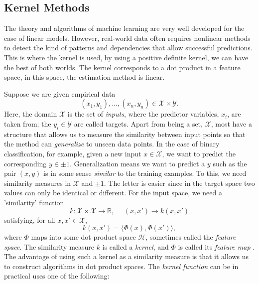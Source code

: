 \subsection{Kernel Methods}
The theory and algorithms of machine learning are very well developed for the case of linear models. However, real-world data often requires nonlinear methods to detect the kind of patterns and dependencies that allow successful predictions. This is where the kernel is used, by using a positive definite kernel, we can have the best of both worlds. The kernel corresponds to a dot product in a feature space, in this space, the estimation method is linear\cite{Hofmann2008}. 

Suppose we are given empirical data
\begin{equation}
(x_1, y_1), ..., (x_n, y_n) \in \mathcal{X} \times \mathcal{Y}.
\end{equation}
Here, the domain $\mathcal{X}$ is the set of \textit{inputs}, where the predictor variables, $x_i$, are taken from; the $y_i \in \mathcal{Y}$ are called targets. Apart from being a set, $\mathcal{X}$, most have a structure that allows us to measure the similarity between input points so that the method can \textit{generalize} to unseen data points. In the case of binary classification, for example, given a new input $x\in \mathcal{X}$, we want to predict the corresponding $y \in {\pm 1}$. Generalization means we want to predict a $y$ such as the pair $(x, y)$ is in some sense \textit{similar} to the training examples. To this, we need similarity measures in $\mathcal{X}$ and ${\pm 1}$. The letter is easier since in the target space two values can only be identical or different. For the input space, we need a 'similarity' function 
\begin{equation}
k: \mathcal{X}\times\mathcal{X} \rightarrow \mathbb{R}, \,\,\,\,\,\,\,\, (x, x') \rightarrow k(x, x')
\end{equation}
satisfying, for all $x, x' \in \mathcal{X}$,
\begin{equation}
k(x, x') = \langle \Phi (x), \Phi(x')\rangle ,
\end{equation}
where $\Phi$ maps into some dot product space $\mathcal{H}$, sometimes called the \textit{feature space}. The similarity measure $k$ is called a \textit{kernel}, and $\Phi$ is called its \textit{feature map} \cite{Hofmann2008}. The advantage of using such a kernel as a similarity measure is that it allows us to construct algorithms in dot product spaces. The \textit{kernel function} can be in practical uses one of the following:

